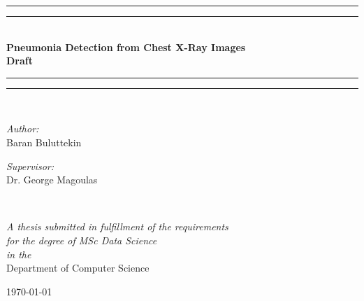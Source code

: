 \documentclass[12pt, twoside, a4paper]{article}
\begin{document}
\begin{titlepage}
    \begin{center}
        \vspace*{.06\textheight}{\scshape\LARGE Birkbeck, University of London\par}\vspace{1.5cm} %
        \rule[0.5ex]{\linewidth}{2pt}\vspace*{-\baselineskip}\vspace*{3.2pt}
        \rule[0.5ex]{\linewidth}{1pt}\\[\baselineskip]
        \huge{\bfseries Pneumonia Detection from Chest X-Ray Images\\ Draft}\\[4mm]
        \rule[0.5ex]{\linewidth}{1pt}\vspace*{-\baselineskip}\vspace{3.2pt}
        \rule[0.5ex]{\linewidth}{2pt}\\
        [1.5cm]


        \begin{minipage}[t]{0.4\textwidth}
        \begin{flushleft} \large
        \emph{Author:}\\
        {Baran Buluttekin} %
        \end{flushleft}
        \end{minipage}
        \begin{minipage}[t]{0.4\textwidth}
        \begin{flushright} \large
        \emph{Supervisor:} \\
        {Dr. George Magoulas} %
        \end{flushright}
        \end{minipage}\\
        [3cm]

            \vfill

            \large \textit{A thesis submitted in fulfillment of the requirements\\ for the degree of MSc Data Science}\\[0.3cm] %
            \textit{in the}\\[0.4cm]
            Department of Computer Science\\[2cm] %
 
            \vfill

            {\large \today}\\[4cm] %
 
            \vfill
    \end{center}
\end{titlepage}    
\end{document}

